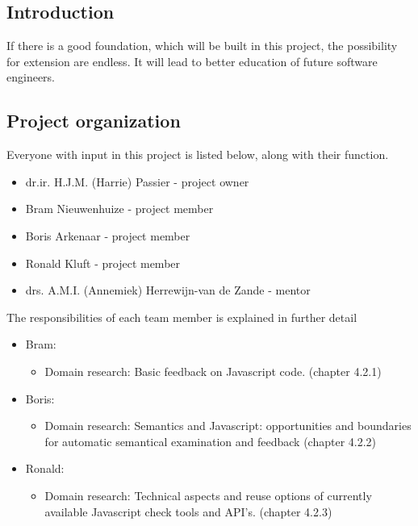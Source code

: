 \documentclass{article}
\begin{document}
\subsection{Introduction} 

If there is a good foundation, which will be built in this project, the 
possibility for extension are endless. It will lead to better education of 
future software engineers. 

\subsection{Project organization} 

Everyone with input in this 
project is listed below, along with their function.
\begin{itemize}
  \item dr.ir.  H.J.M. (Harrie) Passier - project owner
  \item Bram Nieuwenhuize - project member
  \item Boris Arkenaar - project member
  \item Ronald Kluft - project member
  \item drs. A.M.I. (Annemiek) Herrewijn-van de Zande - mentor
\end{itemize}
The responsibilities of each team member is explained in further detail
\begin{itemize}
  \item Bram:
    \begin{itemize}
      \item Domain research: Basic feedback on Javascript code. (chapter
        4.2.1)
    \end{itemize}
  \item Boris:
    \begin{itemize}
      \item Domain research: Semantics and Javascript: opportunities and
        boundaries for automatic semantical examination and feedback (chapter
        4.2.2)
    \end{itemize}
  \item Ronald:
    \begin{itemize}
      \item Domain research: Technical aspects and reuse options of currently
        available Javascript check tools and API's. (chapter 4.2.3)
    \end{itemize}
\end{itemize}
\end{document}
